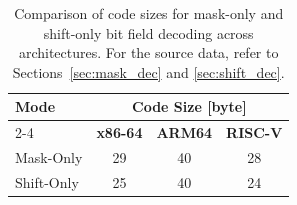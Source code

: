 \begin{table}[ht]
  \centering
  \begin{tabular}{l c c c}
    \toprule
    \multirow{2}{*}[-2pt]{\textbf{Mode}} & \multicolumn{3}{c}{\textbf{Code Size} [byte]}\\
    \cmidrule{2-4}
    & \textbf{x86-64} & \textbf{ARM64} & \textbf{RISC-V}\\
    \midrule
    Mask-Only & 29 & 40 & 28\\
    Shift-Only & 25 & 40 & 24\\
    \bottomrule
  \end{tabular}
  \caption{Bit Field Decoding Code Sizes.}
  \caption*{Comparison of code sizes for mask-only and shift-only bit field decoding across architectures. For the source data, refer to Sections~\ref{sec:mask_dec} and \ref{sec:shift_dec}.}
\end{table}

